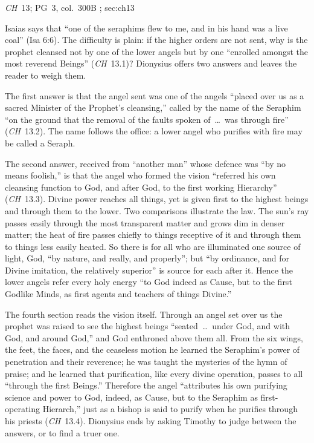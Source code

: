 {\emph{CH}~13; PG~3, col.~300B}
{; }{sec:ch13}

Isaias says that ``one of the seraphims flew to me, and in his hand was a
live coal'' (Isa 6:6). The difficulty is plain: if the higher orders
are not sent, why is the prophet cleansed not by one of the lower angels
but by one ``enrolled amongst the most reverend Beings'' (\emph{CH}~13.1)? Dionysius offers two answers and leaves the reader to weigh them.

The first answer is that the angel sent was one of the angels ``placed
over us as a sacred Minister of the Prophet's cleansing,'' called by the
name of the Seraphim ``on the ground that the removal of the faults
spoken of~\dots\ was through fire'' (\emph{CH}~13.2). The name follows
the office: a lower angel who purifies with fire may be called a
Seraph.

The second answer, received from ``another man'' whose defence was ``by
no means foolish,'' is that the angel who formed the vision ``referred
his own cleansing function to God, and after God, to the first working
Hierarchy'' (\emph{CH}~13.3). Divine power reaches all things, yet is
given first to the highest beings and through them to the lower. Two
comparisons illustrate the law. The sun's ray passes easily through the
most transparent matter and grows dim in denser matter; the heat of fire
passes chiefly to things receptive of it and through them to things less
easily heated. So there is for all who are illuminated one source of
light, God, ``by nature, and really, and properly''; but ``by ordinance,
and for Divine imitation, the relatively superior'' is source for each
after it. Hence the lower angels refer every holy energy ``to God indeed
as Cause, but to the first Godlike Minds, as first agents and teachers of
things Divine.''

The fourth section reads the vision itself. Through an angel set over
us the prophet was raised to see the highest beings ``seated~\dots\
under God, and with God, and around God,'' and God enthroned above them
all. From the six wings, the feet, the faces, and the ceaseless motion he
learned the Seraphim's power of penetration and their reverence; he was
taught the mysteries of the hymn of praise; and he learned that
purification, like every divine operation, passes to all ``through the
first Beings.'' Therefore the angel ``attributes his own purifying
science and power to God, indeed, as Cause, but to the Seraphim as
first-operating Hierarch,'' just as a bishop is said to purify when he
purifies through his priests (\emph{CH}~13.4). Dionysius ends by asking
Timothy to judge between the answers, or to find a truer one.

